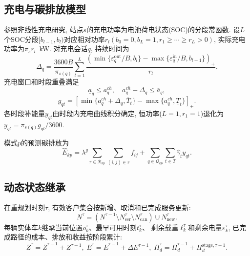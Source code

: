 \documentclass{setp-new}
\begin{document}
\subsection{充电与碳排放模型}

参照非线性充电研究\cite{ref:45,ref:46},
站点$s$的充电功率为电池荷电状态(SOC)的分段常函数.
设$L$个SOC分段$[b_{l-1},b_l)$对应相对功率$r_l(b_0=0,b_L=1,r_1\ge\cdots\ge r_L>0)$,
实际充电功率为$\pi_s r_l$~kW.
对充电会话$q$, 持续时间为
\begin{equation}
\Delta_q=\frac{3600 B}{\pi_{s(q)}}\sum_{l=1}^{L}
\frac{(\min\{\varepsilon_q^{\mathrm{out}}/B,b_l\}
-\max\{\varepsilon_q^{\mathrm{in}}/B,b_{l-1}\})_+}{r_l}.
\label{eq:charge_duration}
\end{equation}
充电窗口和时段重叠满足
\begin{equation}
\underline a_q\le a_q^{ch},\quad a_q^{ch}+\Delta_q\le\overline a_q,
\label{eq:charge_window}
\end{equation}
\begin{equation}
g_{qt}=[\min\{a_q^{ch}+\Delta_q,\overline T_t\}-\max\{a_q^{ch},\underline T_t\}]_+ .
\label{eq:charge_overlap}
\end{equation}
各时段补能量$y_{qt}$由时段内充电曲线积分确定,
恒功率($L=1,r_1=1$)退化为$y_{qt}=\pi_{s(q)}g_{qt}/3600$.

模式$p$的预测碳排放为
\begin{equation}
\widehat E_{kp}=\lambda^g\sum_{r\in\mathcal R_{kp}}\sum_{(i,j)\in r}f_{ij}
+\sum_{q\in\mathcal Q_{kp}}\sum_{t\in T}\widehat\gamma_t y_{qt}.
\label{eq:carbon}
\end{equation}

\subsection{动态状态继承}

在重规划时刻$\tau$, 有效客户集合按新增、取消和已完成服务更新:
\begin{equation}
N^\tau=(N^{\tau-1}\setminus N_{\mathrm{ser}}^\tau\setminus N_{\mathrm{can}}^\tau)\cup N_{\mathrm{new}}^\tau.
\label{eq:customer_update}
\end{equation}
每辆实体车$k$继承当前位置$o_k^\tau$、最早可用时刻$t_k^\tau$、
剩余载重$\ell_k^\tau$和剩余电量$\varepsilon_k^\tau$,
已完成路径的成本、排放和收益按阶段累计:
\begin{equation}
\bar Z^\tau=\bar Z^{\tau-1}+Z^{\tau-1},\;
\bar E^\tau=\bar E^{\tau-1}+\Delta E^{\tau-1},\;
\bar\Pi_d^\tau=\bar\Pi_d^{\tau-1}+\Pi_d^{\mathrm{stage},\tau-1}.
\label{eq:accumulation}
\end{equation}
\end{document}
